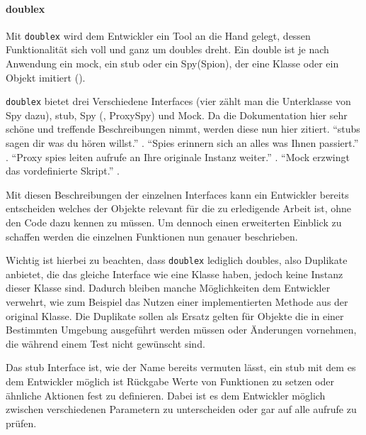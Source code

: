 \paragraph{doublex}\label{python-tools:doublex}\mbox{}
\newline
Mit \lstinline{doublex} wird dem Entwickler ein Tool an die Hand gelegt,
dessen Funktionalität sich voll und ganz um doubles dreht. Ein double ist je
nach Anwendung ein \Gls{mock}, ein \Gls{stub} oder ein Spy(Spion), der eine
Klasse oder ein Objekt imitiert (\cite{doublex:docs:1.8.1}).
\newline

\lstinline{doublex} bietet drei Verschiedene Interfaces (vier zählt man die
Unterklasse von Spy dazu), \Gls{stub}, Spy (, ProxySpy) und Mock. Da die
Dokumentation hier sehr schöne und treffende Beschreibungen nimmt, werden diese 
nun hier zitiert. "`\Glspl{stub} sagen dir was du hören 
willst."' 
. "`Spies erinnern sich 
an alles was Ihnen passiert."' 
. "`Proxy spies leiten aufrufe an Ihre originale 
Instanz weiter."' . "`Mock 
erzwingt das vordefinierte Skript."' 
.

Mit diesen Beschreibungen der einzelnen Interfaces kann ein Entwickler bereits
entscheiden welches der Objekte relevant für die zu erledigende Arbeit ist, ohne
den Code dazu kennen zu müssen. Um dennoch einen erweiterten Einblick zu
schaffen werden die einzelnen Funktionen nun genauer beschrieben.

Wichtig ist hierbei zu beachten, dass \lstinline{doublex} lediglich
doubles, also Duplikate anbietet, die das gleiche Interface wie eine Klasse
haben, jedoch keine Instanz dieser Klasse sind. Dadurch bleiben manche
Möglichkeiten dem Entwickler verwehrt, wie zum Beispiel das Nutzen einer
implementierten Methode aus der original Klasse.
Die Duplikate sollen als Ersatz gelten für Objekte die in einer Bestimmten
Umgebung ausgeführt werden müssen oder Änderungen vornehmen, die während
einem Test nicht gewünscht sind.
\newline

Das \Gls{stub} Interface ist, wie der Name bereits vermuten lässt, ein
\Gls{stub} mit dem es dem Entwickler möglich ist Rückgabe Werte von Funktionen
zu setzen oder ähnliche Aktionen fest zu definieren. Dabei ist es dem Entwickler
möglich zwischen verschiedenen Parametern zu unterscheiden oder gar auf alle
aufrufe zu prüfen.

